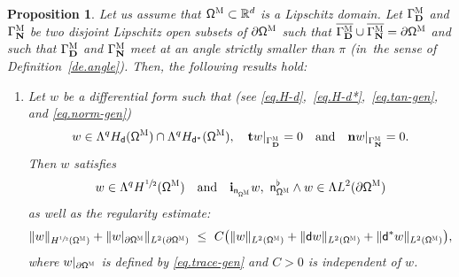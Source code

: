 \documentclass[10pt]{amsart}
\newenvironment{enumeratei}
{\bgroup\def\theenumi{\roman{enumi}}\def\theenumii{\arabic{enumii}}\begin{enumerate}}
{\end{enumerate}\egroup}
\newcommand{\quand}{\quad\text{and}\quad}
\newcommand{\mbf}[1]{\mathbf{#1}}
\let\pa\partial
\theoremstyle{plain}
\newtheorem{proposition}{Proposition}
\theoremstyle{definition}
\begin{document}
\begin{proposition}
\label{pr.QTN}
Let us assume that $\mathsf \Omega^{\textsc{M}}\subset \mathbb R^d$ is a Lipschitz domain. Let $\Gamma^{\textsc{M}}_{\mbf D}$
and $\Gamma^{\textsc{M}}_{\mbf N}$ be two disjoint Lipschitz open subsets of $\partial \mathsf \Omega^{\textsc{M}}$ such that $\overline{\Gamma^{\textsc{M}}_{\mbf D}} \cup \overline{\Gamma^{\textsc{M}}_{\mbf N}} = \pa
\mathsf \Omega^{\textsc{M}}$ and such that $\Gamma^{\textsc{M}}_{\mbf D}$ and $\Gamma^{\textsc{M}}_{\mbf N}$ meet at an angle
strictly smaller than $\pi$ (in~the sense of Definition~\ref{de.angle}). Then, the following results hold:

\begin{enumeratei}
\item\label{pr.QTNi}
Let $w$ be a differential form such that (see \eqref{eq.H-d},~\eqref{eq.H-d*},~\eqref{eq.tan-gen}, and \eqref{eq.norm-gen})
\[
w\in \Lambda^qH_{\mathsf d}(\mathsf \Omega^{\textsc{M}})\cap \Lambda^qH_{\mathsf d^*}(\mathsf \Omega^{\textsc{M}}), \quad
\mathbf t w|_{\Gamma^{\textsc{M}}_{\mbf D}}=0 \quand 
\mathbf n w|_{\Gamma^{\textsc{M}}_{\mbf N}}=0.
\]
Then $w$ satisfies
\[
w\in\Lambda^{q} H^{\sfrac12} (\mathsf \Omega^{\textsc{M}})\quand
\mathbf{i}_{\mathsf n_{\mathsf \Omega^{\textsc{M}}}} w,\ \mathsf n_{\mathsf \Omega^{\textsc{M}}}^{\flat} \wedge w \in
\Lambda L^2 (\pa\mathsf \Omega^{\textsc{M}})
\]
as well as the regularity estimate:
\begin{equation}\label{eq:subelliptic}
\|w\|_{ H^{\sfrac12} (\mathsf \Omega^{\textsc{M}})}+
\|w|_{\pa\mathsf \Omega^{\textsc{M}}}\|_{ L^{2} (\pa\mathsf \Omega^{\textsc{M}})}\
\leq\ C\bigl(\|w\|_{ L^{2} (\mathsf \Omega^{\textsc{M}})}
+\|\mathsf d w\|_{ L^{2} (\mathsf \Omega^{\textsc{M}})}+\|\mathsf d^*w\|_{ L^{2} (\mathsf \Omega^{\textsc{M}})} \bigr),
\end{equation}
where $w|_{\pa\mathsf \Omega^{\textsc{M}}}$ is defined by \eqref{eq.trace-gen} and $C>0$ is independent of $w$.


\end{enumeratei}
\end{proposition}
\end{document}
